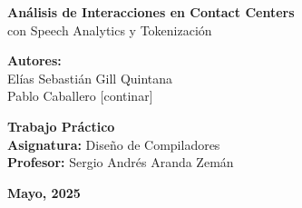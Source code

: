 \begin{center}


	\vspace*{2cm} %
	{\LARGE \textbf{Análisis de Interacciones en Contact Centers} \\
		\vspace{0.3cm} %
		\large con Speech Analytics y Tokenización \\}
	\vspace{1.5cm} %

	\begin{minipage}{0.8\textwidth}
		\centering
		\large
		\textbf{Autores:} \\
		\vspace{0.5cm} %
		Elías Sebastián Gill Quintana \\
		\vspace{0.2cm} %
		Pablo Caballero [continar] \\ %
	\end{minipage}
	\vfill

	\large
	\textbf{Trabajo Práctico} \\
	\vspace{0.3cm}
	\textbf{Asignatura:} Diseño de Compiladores \\
	\vspace{0.3cm}
	\textbf{Profesor:} Sergio Andrés Aranda Zemán \\
	\vspace{1cm}

	\textbf{Mayo, 2025}
	\vspace*{1cm} %

\end{center}
